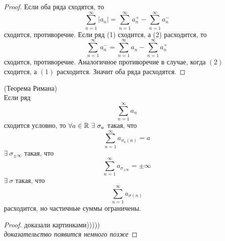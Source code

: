 \begin{proof}
    Если оба ряда сходятся, то
    \[\sum_{n=1}^{\infty}|a_n|=\sum_{n=1}^{\infty}a_n^+-\sum_{n=1}^{\infty}a_n^-\]
    сходится, противоречие.
    Если ряд (1) сходится, а (2) расходится, то
    \[\sum_{n=1}^{\infty}a_n^-=\sum_{n=1}^{\infty}a_n-\sum_{n=1}^{\infty}a_n^+\]
    сходится, противоречие. Аналогичное противоречие в случае, когда $(2)$ сходится, а $(1)$ расходится. Значит оба ряда расходятся.
\end{proof}
\begin{theorem} (Теорема Римана)\\
    Если ряд
    \[\sum_{n=1}^{\infty}a_n\]
    сходится условно, то $\forall a\in \R\ \exists\ \sigma_a$ такая, что
    \[\sum_{n=1}^{\infty}a_{\sigma_a(n)}=a\]
    $\exists\ \sigma_{\pm \infty}$ такая, что
    \[\sum_{n=1}^{\infty}a_{\sigma_{\pm \infty}}=\pm \infty\]
    $\exists\ \sigma$ такая, что
    \[\sum_{n=1}^{\infty}a_{\sigma(n)}\]
    расходится, но частичные суммы ограничены.
\end{theorem}
\begin{proof}
    доказали картинками)))))\\
    \textit{доказательство появится немного позже}
\end{proof}